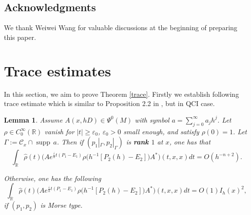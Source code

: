 \documentclass[12pt,reqno]{amsart}
\renewcommand{\epsilon}{\varepsilon}
\newcommand{\supp}{{\operatorname{supp\,}}}
\newtheorem{lem}[cor]{{\sc Lemma}}
\numberwithin{equation}{section}
\begin{document}
\subsection*{Acknowledgments} We thank Weiwei Wang for valuable discussions at the beginning of preparing this paper.


\section{Trace estimates}\label{section2}

In this section, we aim to prove Theorem \ref{trace}. Firstly we establish following trace estimate which is similar to Proposition 2.2 in \cite{SZ02}, but in QCI case.

\begin{lem}\label{lwl}
Assume $A(x, hD)\in \Psi^0(M)$ with symbol $a=\sum_{j=0}^\infty a_j h^j$. Let $\rho\in C_0^\infty(\mathbb{R})$ vanish for $|t|\geq \epsilon_0$, $\epsilon_0>0$ small enough, and satisfy $\rho(0)=1$. Let $\Gamma:=\mathcal{C}_x\cap \supp a$. Then if $(p_1|_{\Gamma}, p_2|_{\Gamma})$ is {\bf rank $1$} at $x$, one has that
\begin{equation}\label{main lemma eq2}
\int_{\mathbb{R}} \hat{\rho}(t) \big(A e^{\frac{i}h t(P_1-E_1)}  \rho\big(h^{-1}[P_2(h)-E_2]\big)  A^*\big)(t,x,x) dt =O(h^{-n+2}).
\end{equation}

Otherwise, one has the following
\begin{equation}\label{main lemma eq}
\int_{\mathbb{R}} \hat{\rho}(t) \big(A e^{\frac{i}h t(P_1-E_1)}  \rho\big(h^{-1}[P_2(h)-E_2]\big)  A^*\big)(t,x,x) dt=O(1) I_h(x)^2,
\end{equation}
if $(p_1, p_2)$ is Morse type.
\end{lem}
\end{document}
